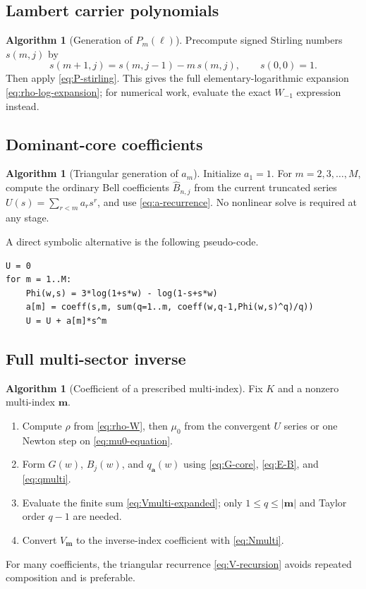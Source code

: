 \documentclass[11pt,a4paper]{article}
\numberwithin{equation}{section}
\theoremstyle{definition}
\newtheorem{algorithm}[theorem]{Algorithm}
\theoremstyle{remark}
\newcommand{\Bhat}{\widehat{B}}
\newcommand{\multi}[1]{\boldsymbol{#1}}
\newcommand{\abs}[1]{\lvert#1\rvert}
\begin{document}
\subsection{Lambert carrier polynomials}

\begin{algorithm}[Generation of $P_m(\ell)$]
Precompute signed Stirling numbers $s(m,j)$ by
\[
 s(m+1,j)=s(m,j-1)-m\,s(m,j),
 \qquad s(0,0)=1.
\]
Then apply \eqref{eq:P-stirling}.  This gives the full elementary-logarithmic
expansion \eqref{eq:rho-log-expansion}; for numerical work, evaluate the exact
$W_{-1}$ expression instead.
\end{algorithm}

\subsection{Dominant-core coefficients}

\begin{algorithm}[Triangular generation of $a_m$]
Initialize $a_1=1$.  For $m=2,3,\ldots,M$, compute the ordinary Bell
coefficients $\Bhat_{n,j}$ from the current truncated series
$U(s)=\sum_{r<m}a_rs^r$, and use \eqref{eq:a-recurrence}.  No nonlinear solve is
required at any stage.
\end{algorithm}

A direct symbolic alternative is the following pseudo-code.
\begin{lstlisting}
U = 0
for m = 1..M:
    Phi(w,s) = 3*log(1+s*w) - log(1-s+s*w)
    a[m] = coeff(s,m, sum(q=1..m, coeff(w,q-1,Phi(w,s)^q)/q))
    U = U + a[m]*s^m
\end{lstlisting}

\subsection{Full multi-sector inverse}

\begin{algorithm}[Coefficient of a prescribed multi-index]
Fix $K$ and a nonzero multi-index $\multi m$.
\begin{enumerate}[label=\arabic*.]
\item Compute $\rho$ from \eqref{eq:rho-W}, then $\mu_0$ from the convergent
      $U$ series or one Newton step on \eqref{eq:mu0-equation}.
\item Form $G(w)$, $B_j(w)$, and $q_{\multi a}(w)$ using
      \eqref{eq:G-core}, \eqref{eq:E-B}, and \eqref{eq:qmulti}.
\item Evaluate the finite sum \eqref{eq:Vmulti-expanded}; only
      $1\leq q\leq\abs{\multi m}$ and Taylor order $q-1$ are needed.
\item Convert $V_{\multi m}$ to the inverse-index coefficient with
      \eqref{eq:Nmulti}.
\end{enumerate}
For many coefficients, the triangular recurrence \eqref{eq:V-recursion} avoids
repeated composition and is preferable.
\end{algorithm}
\end{document}
